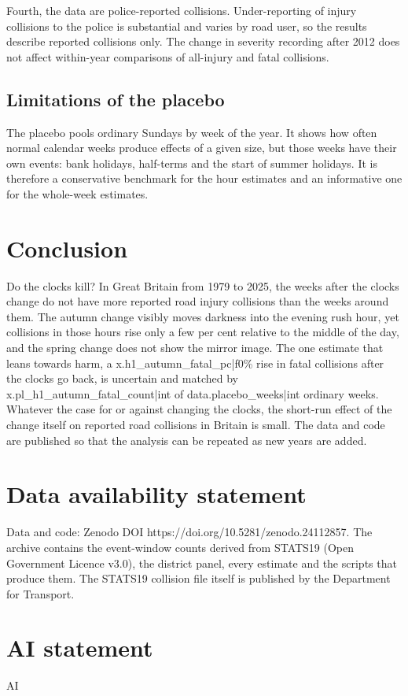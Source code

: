 \documentclass[11pt,a4paper]{article}
\begin{document}
Fourth, the data are police-reported collisions. Under-reporting of injury collisions to the police is substantial and varies by road user, so the results describe reported collisions only. The change in severity recording after 2012 does not affect within-year comparisons of all-injury and fatal collisions.

\subsection{Limitations of the placebo}
The placebo pools ordinary Sundays by week of the year. It shows how often normal calendar weeks produce effects of a given size, but those weeks have their own events: bank holidays, half-terms and the start of summer holidays. It is therefore a conservative benchmark for the hour estimates and an informative one for the whole-week estimates.

\section{Conclusion}\label{sec:conc}
Do the clocks kill? In Great Britain from 1979 to 2025, the weeks after the clocks change do not have more reported road injury collisions than the weeks around them. The autumn change visibly moves darkness into the evening rush hour, yet collisions in those hours rise only a few per cent relative to the middle of the day, and the spring change does not show the mirror image. The one estimate that leans towards harm, a {{x.h1_autumn_fatal_pc|f0}}\% rise in fatal collisions after the clocks go back, is uncertain and matched by {{x.pl_h1_autumn_fatal_count|int}} of {{data.placebo_weeks|int}} ordinary weeks. Whatever the case for or against changing the clocks, the short-run effect of the change itself on reported road collisions in Britain is small. The data and code are published so that the analysis can be repeated as new years are added.

\section*{Data availability statement}
Data and code: Zenodo DOI https://doi.org/10.5281/zenodo.24112857. The archive contains the event-window counts derived from STATS19 (Open Government Licence v3.0), the district panel, every estimate and the scripts that produce them. The STATS19 collision file itself is published by the Department for Transport.

\section*{AI statement}
{{AI}}
\end{document}
